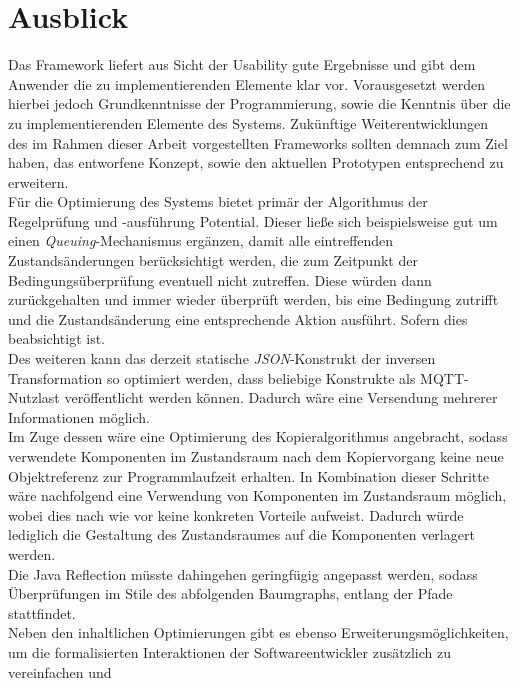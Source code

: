 \chapter{Ausblick}
\label{chap:ausblick}
    Das Framework liefert aus Sicht der Usability gute Ergebnisse und gibt dem Anwender die zu implementierenden Elemente klar vor. 
    Vorausgesetzt werden hierbei jedoch Grundkenntnisse der Programmierung, sowie die Kenntnis über die zu implementierenden Elemente des Systems. 
    Zukünftige Weiterentwicklungen des im Rahmen dieser Arbeit vorgestellten Frameworks sollten demnach zum Ziel haben, das entworfene Konzept, 
    sowie den aktuellen Prototypen entsprechend zu erweitern. 
    \\
    \linebreak
    Für die Optimierung des Systems bietet primär der Algorithmus der Regelprüfung und -ausführung Potential. Dieser ließe sich beispielsweise 
    gut um einen \textit{Queuing}-Mechanismus ergänzen, damit alle eintreffenden Zustandsänderungen berücksichtigt werden, die zum 
    Zeitpunkt der Bedingungsüberprüfung eventuell nicht zutreffen. Diese würden dann zurückgehalten und immer wieder überprüft werden, bis eine 
    Bedingung zutrifft und die Zustandsänderung eine entsprechende Aktion ausführt. Sofern dies beabsichtigt ist. 
    \\
    \linebreak
    Des weiteren kann das derzeit statische \textit{JSON}-Konstrukt der inversen Transformation so optimiert werden, dass beliebige Konstrukte 
    als \acs{MQTT}-Nutzlast veröffentlicht werden können. Dadurch wäre eine Versendung mehrerer Informationen möglich. 
    \\
    Im Zuge dessen wäre eine Optimierung des Kopieralgorithmus angebracht, sodass verwendete Komponenten im Zustandsraum nach dem Kopiervorgang keine neue 
    Objektreferenz zur Programmlaufzeit erhalten. In Kombination dieser Schritte wäre nachfolgend eine Verwendung von Komponenten im Zustandsraum möglich, wobei 
    dies nach wie vor keine konkreten Vorteile aufweist. Dadurch würde lediglich die Gestaltung des Zustandsraumes auf die Komponenten verlagert werden. 
    \\
    Die Java Reflection müsste dahingehen geringfügig angepasst werden, sodass Überprüfungen im Stile des abfolgenden Baumgraphs, entlang der Pfade stattfindet.
    \\
    \linebreak
    Neben den inhaltlichen Optimierungen gibt es ebenso Erweiterungsmöglichkeiten, um die formalisierten Interaktionen der Softwareentwickler zusätzlich zu vereinfachen und 

